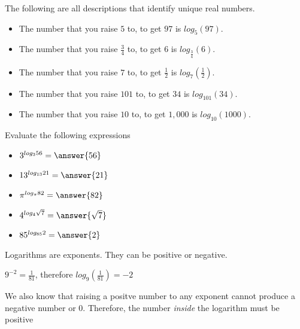 \documentclass{ximera}
\begin{document}
\begin{example}
The following are all descriptions that identify unique real numbers.

\begin{itemize}
\item The number that you raise $5$ to, to get $97$ is $log_5(97)$.
\item The number that you raise $\frac{3}{4}$ to, to get $6$ is $log_{\tfrac{3}{4}}(6)$.
\item The number that you raise $7$ to, to get $\frac{1}{2}$ is $log_7\left(\frac{1}{2}\right)$.
\item The number that you raise $101$ to, to get $34$ is $log_{101}(34)$.
\item The number that you raise $10$ to, to get $1,000$ is $log_{10}(1000)$.
\end{itemize}

\end{example}



\begin{example}
Evaluate the following expressions

\begin{itemize}
\item  $3^{log_3{56}} = \answer{56}$
\item  $13^{log_{13}{21}} = \answer{21}$
\item  $\pi^{log_{\pi}{82}} = \answer{82}$
\item  $4^{log_4{\sqrt{7}}} = \answer{\sqrt{7}}$
\item  $85^{log_{85}{2}} = \answer{2}$

\end{itemize}

\end{example}












Logarithms are exponents.  They can be positive or negative.



$9^{-2} = \frac{1}{81}$, therefore  $log_{9}\left(\frac{1}{81}\right) = -2$



We also know that raising a positve number to any exponent cannot produce a negative number or $0$.  Therefore, the number \textit{inside} the logarithm must be positive
\end{document}
